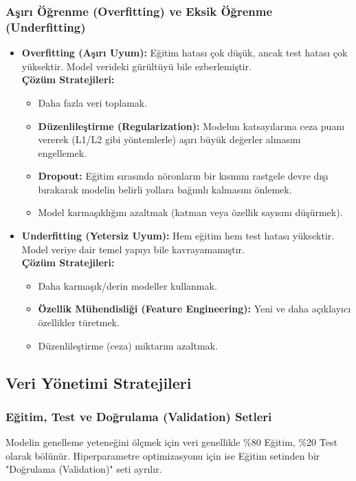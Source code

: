 \documentclass[12pt,a4paper]{article}
\begin{document}
\subsubsection{Aşırı Öğrenme (Overfitting) ve Eksik Öğrenme (Underfitting)}
\begin{itemize}
    \item \textbf{Overfitting (Aşırı Uyum):} Eğitim hatası çok düşük, ancak test hatası çok yüksektir. Model verideki gürültüyü bile ezberlemiştir.
    \\ \textbf{Çözüm Stratejileri:} 
    \begin{itemize}
        \item Daha fazla veri toplamak.
        \item \textbf{Düzenlileştirme (Regularization):} Modelun katsayılarına ceza puanı vererek (L1/L2 gibi yöntemlerle) aşırı büyük değerler almasını engellemek.
        \item \textbf{Dropout:} Eğitim sırasında nöronların bir kısmını rastgele devre dışı bırakarak modelin belirli yollara bağımlı kalmasını önlemek.
        \item Model karmaşıklığını azaltmak (katman veya özellik sayısını düşürmek).
    \end{itemize}
    
    \item \textbf{Underfitting (Yetersiz Uyum):} Hem eğitim hem test hatası yüksektir. Model veriye dair temel yapıyı bile kavrayamamıştır.
    \\ \textbf{Çözüm Stratejileri:} 
    \begin{itemize}
        \item Daha karmaşık/derin modeller kullanmak.
        \item \textbf{Özellik Mühendisliği (Feature Engineering):} Yeni ve daha açıklayıcı özellikler türetmek.
        \item Düzenlileştirme (ceza) miktarını azaltmak.
    \end{itemize}
\end{itemize}

\subsection{Veri Yönetimi Stratejileri}
\subsubsection{Eğitim, Test ve Doğrulama (Validation) Setleri}
Modelin genelleme yeteneğini ölçmek için veri genellikle \%80 Eğitim, \%20 Test olarak bölünür. Hiperparametre optimizasyonu için ise Eğitim setinden bir "Doğrulama (Validation)" seti ayrılır.
\end{document}
